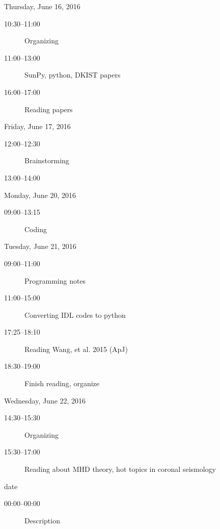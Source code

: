 \documentclass{article}
\newcommand{\mydate}[1]{\textcolor{cadmiumgreen}{#1}}
\begin{document}
\mydate{Thursday, June 16, 2016}
\begin{description}
    \item [10:30--11:00] Organizing
    \item [11:00--13:00] SunPy, python, DKIST papers
    \item [16:00--17:00] Reading papers
\end{description}
\mydate{Friday, June 17, 2016}
\begin{description}
    \item [12:00--12:30] Brainstorming
    \item [13:00--14:00]
\end{description}
\mydate{Monday, June 20, 2016}
\begin{description}
    \item [09:00--13:15] Coding
\end{description}
\mydate{Tuesday, June 21, 2016}
\begin{description}
    \item [09:00--11:00] Programming notes
    \item [11:00--15:00] Converting IDL codes to python
    \item [17:25--18:10] Reading Wang, et al. 2015 (ApJ)
    \item [18:30--19:00] Finish reading, organize
\end{description}

\mydate{Wednesday, June 22, 2016}
\begin{description}
    \item [14:30--15:30] Organizing
    \item [15:30--17:00] Reading about MHD theory, hot topics in
        coronal seismology
\end{description}

\mydate{date}
\begin{description}
    \item [00:00--00:00] Description
\end{description}
\end{document}
